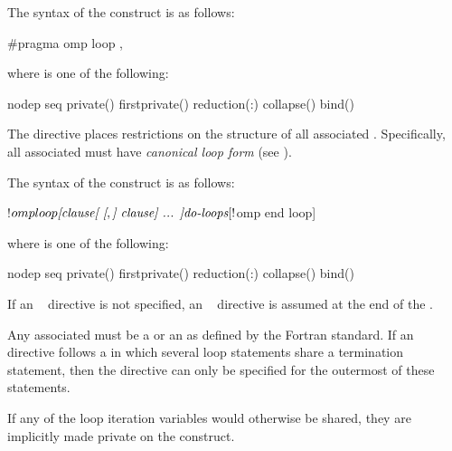 \syntax
\begin{ccppspecific}
The syntax of the  construct is as follows:
\begin{ompcPragma}
#pragma omp loop \plc{[clause[ [},\plc{] clause] ... ] new-line}
\end{ompcPragma}

where  is one of the following:

\begin{indentedcodelist}
nodep
seq
private()
firstprivate()
reduction(:)
collapse()
bind()
\end{indentedcodelist}
The  directive places restrictions on the structure of all associated .
Specifically, all associated  must have \emph{canonical loop form} (see
).
\end{ccppspecific}

\begin{fortranspecific}
The syntax of the  construct is as follows:

\begin{ompfPragma}
!$omp loop \plc{[clause[ [},\plc{] clause] ... ]}
   \plc{do-loops}
[!$omp end loop]
\end{ompfPragma}

\begin{samepage}
where  is one of the following:

\begin{indentedcodelist}
nodep
seq
private()
firstprivate()
reduction(:)
collapse()
bind()
\end{indentedcodelist}
\end{samepage}

If an ~ directive is not specified, an
  ~ directive is assumed at the end of the
.

Any associated  must be a  or an
 as defined by the Fortran standard. If
an ~ directive follows a  in
which several loop statements share a  termination statement,
then the directive can only be specified for the outermost of these
 statements.

If any of the loop iteration variables would otherwise be shared, they are implicitly
  made private on the  construct.
\end{fortranspecific}

